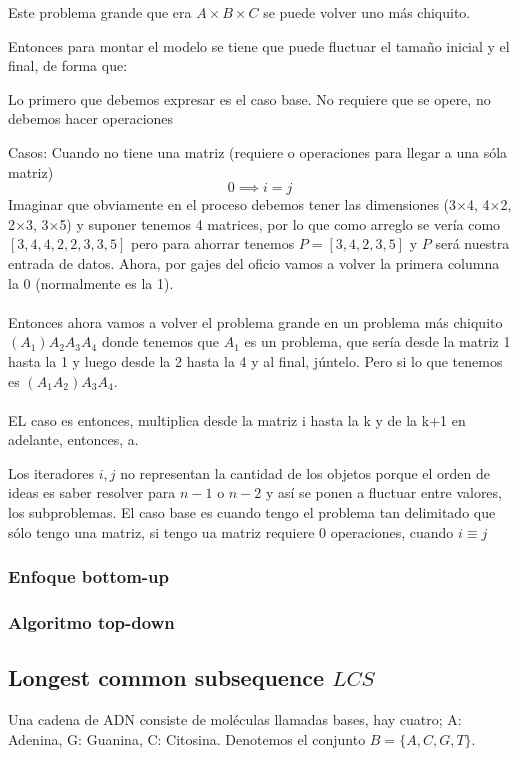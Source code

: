 \documentclass[tikz,11pt,fleqn]{book} %
\begin{document}
\begin{fact}
    Este problema grande que era $A\times B\times C$ se puede volver uno más chiquito.

    Entonces para montar el modelo se tiene que puede fluctuar el tamaño inicial y el final, de forma que:

    Lo primero que debemos expresar es el caso base. No requiere que se opere, no debemos hacer operaciones

Casos:
    Cuando no tiene una matriz (requiere o operaciones para llegar a una sóla matriz)
    $$
        0\implies i=j  
    $$
    Imaginar que obviamente en el proceso debemos tener las dimensiones (3$\times$4, 4$\times$2, 2$\times$3, 3$\times$5) y suponer tenemos 4 matrices, por lo que como arreglo se vería como $[3,4,4,2,2,3,3,5]$ pero para ahorrar tenemos $P=[3,4,2,3,5]$ y $P$ será nuestra entrada de datos. Ahora, por gajes del oficio vamos a volver la primera columna la 0 (normalmente es la 1).
    \\~\\
    Entonces ahora vamos a volver el problema grande en un problema más chiquito $(A_1) A_2 A_3 A_4$ donde tenemos que $A_1$ es un problema, que sería desde la matriz 1 hasta la 1 y luego desde la 2 hasta la 4 y al final, júntelo.
    Pero si lo que tenemos es $(A_1 A_2) A_3 A_4$.
    \\~\\
    EL caso es entonces, multiplica desde la matriz i hasta la k y de la k+1 en adelante, entonces, a.
\end{fact}

Los iteradores $i,j$ no representan la cantidad de los objetos porque el orden de ideas es saber resolver para $n-1$ o $n-2$ y así se ponen a fluctuar entre valores, los subproblemas.
El caso base es cuando tengo el problema tan delimitado que sólo tengo una matriz, si tengo ua matriz requiere 0 operaciones, cuando $i\equiv j$

\subsubsection{Enfoque bottom-up}


\subsubsection{Algoritmo top-down}


\subsection{Longest common subsequence $LCS$}
Una cadena de ADN consiste de moléculas llamadas bases, hay cuatro; A: Adenina, G: Guanina, C: Citosina. Denotemos el conjunto $B=\{A,C,G,T\}$.
\end{document}

